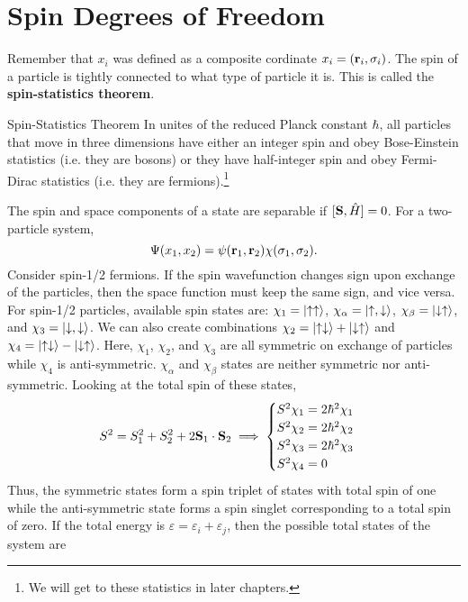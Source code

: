 \section{Spin Degrees of Freedom}
    Remember that $x_i$ was defined as a composite cordinate $x_i=(\mathbf{r}_i,\sigma_i)$. The spin of a particle is tightly connected to what type of particle it is. This is called the \textbf{spin-statistics theorem}.
    \begin{theorem}{Spin-Statistics Theorem}
        In unites of the reduced Planck constant $\hbar$, all particles that move in three dimensions have either an integer spin and obey Bose-Einstein statistics (i.e. they are bosons) or they have half-integer spin and obey Fermi-Dirac statistics (i.e. they are fermions).\footnote{We will get to these statistics in later chapters.}
    \end{theorem}
    The spin and space components of a state are separable if $[\mathbf{S},\hat{H}]=0$. For a two-particle system,
    \begin{equation}
        \Psi(x_1,x_2) = \psi(\mathbf{r}_1,\mathbf{r}_2)\chi(\sigma_1,\sigma_2).
    \end{equation}
    Consider spin-1/2 fermions. If the spin wavefunction changes sign upon exchange of the particles, then the space function must keep the same sign, and vice versa. For spin-1/2 particles, available spin states are: $\chi_1 = \left| \uparrow \uparrow \right>$, $\chi_\alpha=\left| \uparrow, \downarrow \right>$, $\chi_\beta=\left| \downarrow \uparrow \right>$, and $\chi_3 = \left| \downarrow, \downarrow \right>$. We can also create combinations $\chi_2 = \left| \uparrow \downarrow \right> + \left| \downarrow \uparrow \right>$ and $\chi_4 = \left| \uparrow\downarrow \right>-\left| \downarrow \uparrow \right>$. Here, $\chi_1$, $\chi_2$, and $\chi_3$ are all symmetric on exchange of particles while $\chi_4$ is anti-symmetric. $\chi_\alpha$ and $\chi_\beta$ states are neither symmetric nor anti-symmetric. Looking at the total spin of these states, 
    \begin{equation}
        S^2 = S_1^2+S_2^2+2\mathbf{S}_1\cdot\mathbf{S}_2 \implies \begin{cases}
            S^2\chi_1 = 2\hbar^2\chi_1 \\
            S^2\chi_2 = 2\hbar^2\chi_2 \\
            S^2\chi_3 = 2\hbar^2\chi_3 \\
            S^2\chi_4 = 0
        \end{cases}
    \end{equation}
    Thus, the symmetric states form a spin triplet of states with total spin of one while the anti-symmetric state forms a spin singlet corresponding to a total spin of zero. If the total energy is $\varepsilon=\varepsilon_i+\varepsilon_j$, then the possible total states of the system are
